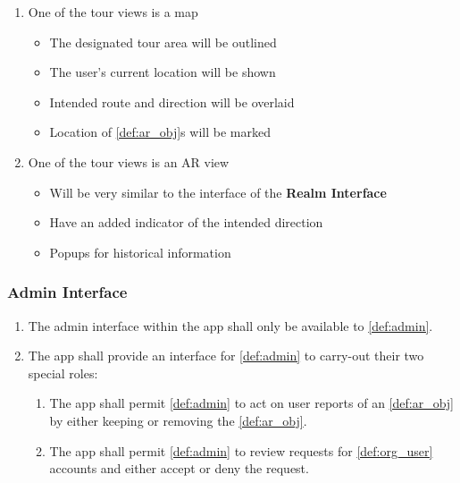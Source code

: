 \documentclass{article}
\begin{document}
\begin{enumerate}[align=left, label=\textbf{TR-FR\arabic*:}]
\begin{enumerate}[align=left, label=\textbf{TR-FR4.\arabic*:}]
        \item One of the tour views is a map
        \begin{itemize}
            \item The designated tour area will be outlined
            \item The user’s current location will be shown
            \item Intended route and direction will be overlaid
            \item Location of \ref{def:ar_obj}s will be marked
        \end{itemize}
        \item One of the tour views is an AR view
        \begin{itemize}
            \item Will be very similar to the interface of the \textbf{Realm Interface}
            \item Have an added indicator of the intended direction
            \item Popups for historical information
        \end{itemize}
    \end{enumerate}
\end{enumerate}

\subsubsection{Admin Interface}
\label{ssub:admin_interface}

\begin{enumerate}[align=left, label=\textbf{AI-FR\arabic*:}]
    \item The admin interface within the app shall only be available to \ref{def:admin}.
    \item The app shall provide an interface for \ref{def:admin} to carry-out their two special roles:
    \begin{enumerate}[align=left, label=\textbf{AI-FR2.\arabic*:}]
        \item The app shall permit \ref{def:admin} to act on user reports of an \ref{def:ar_obj} by either keeping or removing the \ref{def:ar_obj}.
        \item The app shall permit \ref{def:admin} to review requests for \ref{def:org_user} accounts and either accept or deny the request.
    \end{enumerate}
\end{enumerate}
\end{document}
